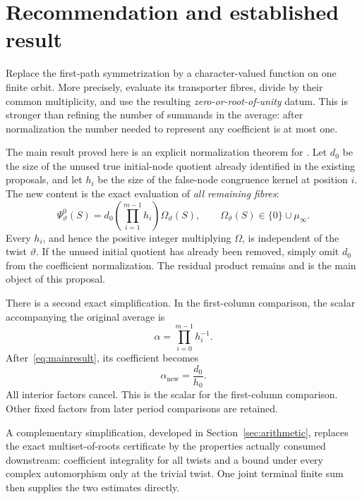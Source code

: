 \section{Recommendation and established result}

Replace the first-path symmetrization by a character-valued function on one finite orbit. More precisely, evaluate its transporter fibres, divide by their common multiplicity, and use the resulting \emph{zero-or-root-of-unity} datum. This is stronger than refining the number of summands in the average: after normalization the number needed to represent any coefficient is at most one.

The main result proved here is an explicit normalization theorem for . Let $d_0$ be the size of the unused true initial-node quotient already identified in the existing proposals, and let $h_i$ be the size of the false-node congruence kernel at position $i$. The new content is the exact evaluation of \emph{all remaining fibres}:
\begin{equation}\label{eq:mainresult}
 \Psi^0_\vartheta(S)
 =d_0\left(\prod_{i=1}^{m-1}h_i\right)\Omega_\vartheta(S),
 \qquad \Omega_\vartheta(S)\in\{0\}\cup\mu_\infty.
\end{equation}
Every $h_i$, and hence the positive integer multiplying $\Omega$, is independent of the twist $\vartheta$. If the unused initial quotient has already been removed, simply omit $d_0$ from the coefficient normalization. The residual product remains and is the main object of this proposal.

There is a second exact simplification. In the first-column comparison, the scalar accompanying the original average is
\[
 \alpha=\prod_{i=0}^{m-1}h_i^{-1}.
\]
After~\eqref{eq:mainresult}, its coefficient becomes
\begin{equation}\label{eq:endpointscalar}
 \alpha_{\mathrm{new}}=\frac{d_0}{h_0}.
\end{equation}
All interior factors cancel. This is the scalar for the first-column comparison. Other fixed factors from later period comparisons are retained.

A complementary simplification, developed in Section~\ref{sec:arithmetic}, replaces the exact multiset-of-roots certificate by the properties actually consumed downstream: coefficient integrality for all twists and a bound under every complex automorphism only at the trivial twist. One joint terminal finite sum then supplies the two estimates directly.

